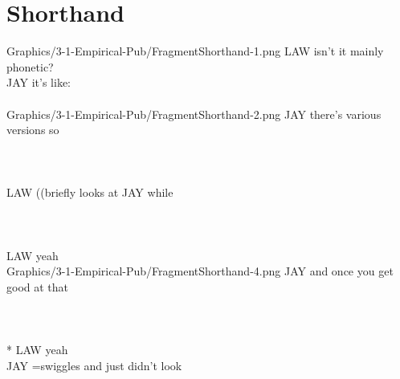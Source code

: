 



\section{Shorthand}\label{app:fragments-pub shorthand}
\begin{inlinefrag*} 
    \begin{transcript*}
           {Graphics/3-1-Empirical-Pub/FragmentShorthand-1.png}
        \by LAW {isn't it mainly phonetic?} \\
        \by JAY {it's like:\vspace*{1.65cm}} \\
         \\
           {Graphics/3-1-Empirical-Pub/FragmentShorthand-2.png}
        \by JAY {there's various versions so} \\
         \\
         \\
         \\
        \by  LAW {((briefly looks at JAY while } \\
         \\
         \\
         \\
        \by LAW {\intDown{}yeah} \\
           {Graphics/3-1-Empirical-Pub/FragmentShorthand-4.png}
        \by JAY {and once you get good at that} \\
         \\
         \\
         \\*
        \by LAW {\intDown{}yeah} \\
        \by JAY {=swiggles and just didn't look} \\
         \\

\end{transcript*}
\end{inlinefrag*}
